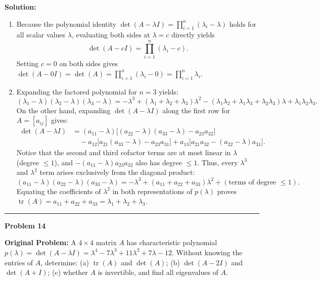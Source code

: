 \documentclass[11pt, letterpaper]{article}
\theoremstyle{definition}
\theoremstyle{remark}
\begin{document}
\textbf{Solution:}
\begin{enumerate}[label=(\alph*), topsep=3pt, itemsep=4pt]
    \item Because the polynomial identity $\det(A - \lambda I) = \prod_{i=1}^{n} (\lambda_i - \lambda)$ holds for all scalar values $\lambda$, evaluating both sides at $\lambda = c$ directly yields
    \[
    \det(A - cI) = \prod_{i=1}^{n} (\lambda_i - c).
    \]
    Setting $c = 0$ on both sides gives $\det(A - 0I) = \det(A) = \prod_{i=1}^{n} (\lambda_i - 0) = \prod_{i=1}^{n} \lambda_i$.
    \item Expanding the factored polynomial for $n = 3$ yields:
    \[
    (\lambda_1 - \lambda)(\lambda_2 - \lambda)(\lambda_3 - \lambda) = -\lambda^3 + (\lambda_1 + \lambda_2 + \lambda_3)\lambda^2 - (\lambda_1\lambda_2 + \lambda_1\lambda_3 + \lambda_2\lambda_3)\lambda + \lambda_1\lambda_2\lambda_3.
    \]
    On the other hand, expanding $\det(A - \lambda I)$ along the first row for $A = [a_{ij}]$ gives:
    \begin{align*}
    \det(A - \lambda I) &= (a_{11} - \lambda)\big[(a_{22} - \lambda)(a_{33} - \lambda) - a_{23}a_{32}\big] \\
    &\quad - a_{12}\big[a_{21}(a_{33} - \lambda) - a_{23}a_{31}\big] + a_{13}\big[a_{21}a_{32} - (a_{22} - \lambda)a_{31}\big].
    \end{align*}
    Notice that the second and third cofactor terms are at most linear in $\lambda$ (degree $\le 1$), and $-(a_{11} - \lambda)a_{23}a_{32}$ also has degree $\le 1$. Thus, every $\lambda^3$ and $\lambda^2$ term arises exclusively from the diagonal product:
    \[
    (a_{11} - \lambda)(a_{22} - \lambda)(a_{33} - \lambda) = -\lambda^3 + (a_{11} + a_{22} + a_{33})\lambda^2 + (\text{terms of degree } \le 1).
    \]
    Equating the coefficients of $\lambda^2$ in both representations of $p(\lambda)$ proves $\operatorname{tr}(A) = a_{11} + a_{22} + a_{33} = \lambda_1 + \lambda_2 + \lambda_3$.
\end{enumerate}

\noindent\rule{\textwidth}{0.4pt}

\noindent\textbf{Problem 14}

\textbf{Original Problem:} A $4 \times 4$ matrix $A$ has characteristic polynomial $p(\lambda) = \det(A - \lambda I) = \lambda^4 - 7\lambda^3 + 11\lambda^2 + 7\lambda - 12$. Without knowing the entries of $A$, determine: (a) $\operatorname{tr}(A)$ and $\det(A)$; (b) $\det(A - 2I)$ and $\det(A + I)$; (c) whether $A$ is invertible, and find all eigenvalues of $A$.
\end{document}
